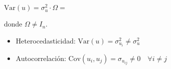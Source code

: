 \documentclass[10pt, a4paper, landscape]{extarticle}
\newcommand{\Var}{\mathrm{Var}}
\newcommand{\Cov}{\mathrm{Cov}}
\begin{document}
\begin{multicols}{3}
	\begin{center}
		$\Var(u) = \sigma^2_u \cdot \Omega =$
	\end{center}
	\quad donde $\Omega \neq I_n$.
	\begin{itemize}[leftmargin=*]
		\item Heterocedasticidad: $\Var(u) = \sigma^2_{u_i} \neq \sigma^2_u$
		\item Autocorrelación: $\Cov(u_i, u_j) = \sigma_{u_{ij}} \neq 0 \quad \forall i \neq j$
	\end{itemize}


\end{multicols}
\end{document}
